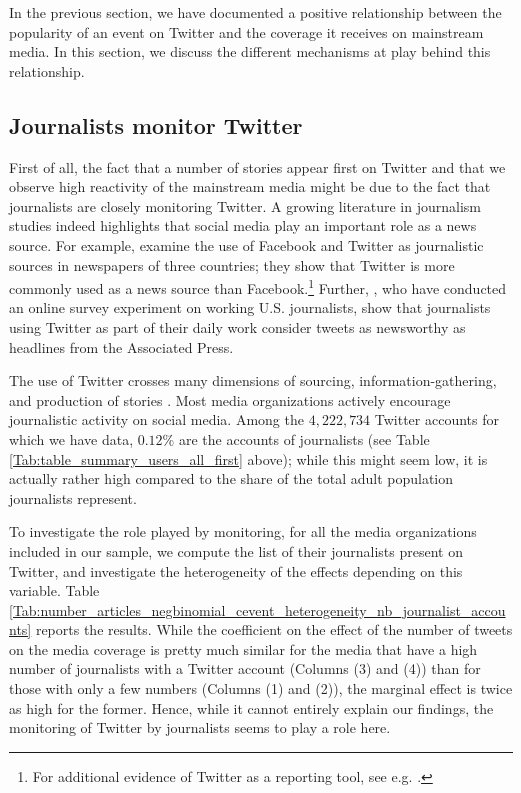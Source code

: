 In the previous section, we have documented a positive relationship between the popularity of an event on Twitter and the coverage it receives on mainstream media. In this section, we discuss the different mechanisms at play behind this relationship.

\subsection{Journalists monitor Twitter}

First of all, the fact that a number of stories appear first on Twitter and that we observe high reactivity of the mainstream media might be due to the fact that journalists are closely monitoring Twitter. A growing literature in journalism studies indeed highlights that social media play an important role as a news source. For example, \citet{vonNordheimBoczekKoppers2018} examine the use of Facebook and Twitter as journalistic sources in newspapers of three countries; they show that Twitter is more commonly used as a news source than Facebook.\footnote{For additional evidence of Twitter as a reporting tool, see e.g. \citet{Vis2012}.} Further, \citet{McGregorMolyneux2018}, who have conducted an online survey experiment on working U.S. journalists, show that journalists using Twitter as part of their daily work consider tweets as newsworthy as headlines from the Associated Press.

The use of Twitter crosses many dimensions of sourcing, information-gathering, and production of stories \citep{Wihbeyetal2018}. Most media organizations actively encourage journalistic activity on social media.   Among the $4,222,734$ Twitter accounts for which we have data, $0.12\%$ are the accounts of journalists (see Table \ref{Tab:table_summary_users_all_first} above); while this might seem low, it is actually rather high compared to the share of the total adult population journalists represent.

To investigate the role played by monitoring, for all the media organizations included in our sample, we compute the list of their journalists present on Twitter, and investigate the heterogeneity of the effects depending on this variable. Table \ref{Tab:number_articles_negbinomial_cevent_heterogeneity_nb_journalist_accounts} reports the results. While the coefficient on the effect of the number of tweets on the media coverage is pretty much similar for the media that have a high number of journalists with a Twitter account (Columns (3) and (4)) than for those with only a few numbers (Columns (1) and (2)), the marginal effect is twice as high for the former. Hence, while it cannot entirely explain our findings, the monitoring of Twitter by journalists seems to play a role here.


